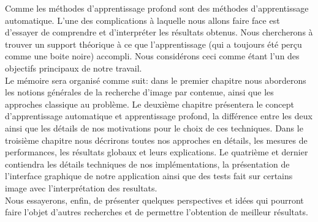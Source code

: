 	Comme les méthodes d’apprentissage profond sont des méthodes d'apprentissage automatique. L'une des complications à laquelle nous allons faire face est d'essayer de comprendre et d'interpréter les résultats obtenus. Nous chercherons à trouver un support théorique à ce que l'apprentissage (qui a toujours été perçu comme une boite noire) accompli. Nous considérons ceci comme étant l'un des objectifs principaux de notre travail.\\

	Le mémoire sera organisé comme suit: dans le premier chapitre nous aborderons les notions générales de la recherche d'image par contenue, ainsi que les approches classique au problème. Le deuxième chapitre présentera le concept d’apprentissage automatique et apprentissage profond, la différence entre les deux ainsi que les détails de nos motivations pour le choix de ces techniques. Dans le troisième chapitre nous décrirons toutes nos approches en détails, les mesures de performances, les résultats globaux et leurs explications. Le quatrième et dernier contiendra les détails techniques de nos implémentations, la présentation de l'interface graphique de notre application ainsi que des tests fait sur certains image avec l’interprétation des resultats.\\

Nous essayerons, enfin, de présenter quelques perspectives et idées qui pourront faire l'objet d'autres recherches et de permettre l'obtention de meilleur résultats.
